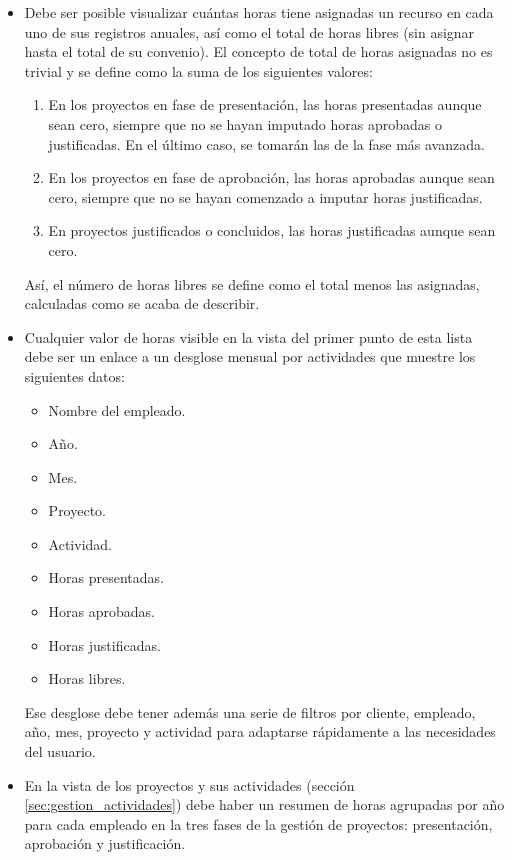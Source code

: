 \begin{itemize}
\item Debe ser posible visualizar cuántas horas tiene asignadas un recurso en
cada uno de sus registros anuales, así como el total de horas libres (sin
asignar hasta el total de su convenio). El concepto de total de horas asignadas
no es trivial y se define como la suma de los siguientes valores:

\begin{enumerate}
  \item En los proyectos en fase de presentación, las horas presentadas aunque
sean cero, siempre que no se hayan imputado horas aprobadas o justificadas. En
el último caso, se tomarán las de la fase más avanzada.
  \item En los proyectos en fase de aprobación, las horas aprobadas aunque sean
cero, siempre que no se hayan comenzado a imputar horas justificadas.
  \item En proyectos justificados o concluidos, las horas justificadas aunque
sean cero.
\end{enumerate}

Así, el número de horas libres se define como el total menos las asignadas,
calculadas como se acaba de describir.

\item Cualquier valor de horas visible en la vista del primer punto de esta
lista debe ser un enlace a un desglose mensual por actividades que muestre los
siguientes datos:
 \begin{itemize}
  \item Nombre del empleado.
  \item Año.
  \item Mes.
  \item Proyecto.
  \item Actividad.
  \item Horas presentadas.
  \item Horas aprobadas.
  \item Horas justificadas.
  \item Horas libres.
 \end{itemize}
Ese desglose debe tener además una serie de filtros por cliente, empleado, año,
mes, proyecto y actividad para adaptarse rápidamente a las necesidades del
usuario.

\item En la vista de los proyectos y sus actividades (sección
\ref{sec:gestion_actividades}) debe haber un resumen de horas agrupadas por año
para cada empleado en la tres fases de la gestión de proyectos: presentación,
aprobación y justificación.


\end{itemize}
